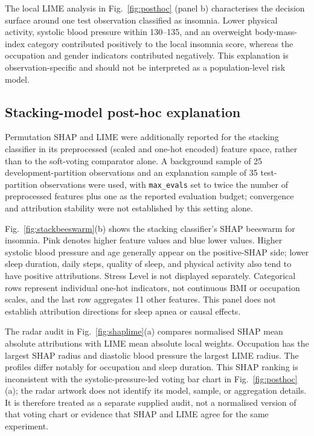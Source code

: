 \documentclass[a4paper,fleqn]{cas-dc}
\begin{document}
The local LIME analysis in Fig.~\ref{fig:posthoc} (panel b) characterises the decision surface around one test observation classified as insomnia. Lower physical activity, systolic blood pressure within 130--135, and an overweight body-mass-index category contributed positively to the local insomnia score, whereas the occupation and gender indicators contributed negatively. This explanation is observation-specific and should not be interpreted as a population-level risk model.

\subsection{Stacking-model post-hoc explanation}
\label{sec:stackpost}
Permutation SHAP and LIME were additionally reported for the stacking classifier in its preprocessed (scaled and one-hot encoded) feature space, rather than to the soft-voting comparator alone. A background sample of 25 development-partition observations and an explanation sample of 35 test-partition observations were used, with \texttt{max\_evals} set to twice the number of preprocessed features plus one as the reported evaluation budget; convergence and attribution stability were not established by this setting alone.

Fig.~\ref{fig:stackbeeswarm}(b) shows the stacking classifier's SHAP beeswarm for insomnia. Pink denotes higher feature values and blue lower values. Higher systolic blood pressure and age generally appear on the positive-SHAP side; lower sleep duration, daily steps, quality of sleep, and physical activity also tend to have positive attributions. Stress Level is not displayed separately. Categorical rows represent individual one-hot indicators, not continuous BMI or occupation scales, and the last row aggregates 11 other features. This panel does not establish attribution directions for sleep apnea or causal effects.

The radar audit in Fig.~\ref{fig:shaplime}(a) compares normalised SHAP mean absolute attributions with LIME mean absolute local weights. Occupation has the largest SHAP radius and diastolic blood pressure the largest LIME radius. The profiles differ notably for occupation and sleep duration. This SHAP ranking is inconsistent with the systolic-pressure-led voting bar chart in Fig.~\ref{fig:posthoc}(a); the radar artwork does not identify its model, sample, or aggregation details. It is therefore treated as a separate supplied audit, not a normalised version of that voting chart or evidence that SHAP and LIME agree for the same experiment.
\end{document}
